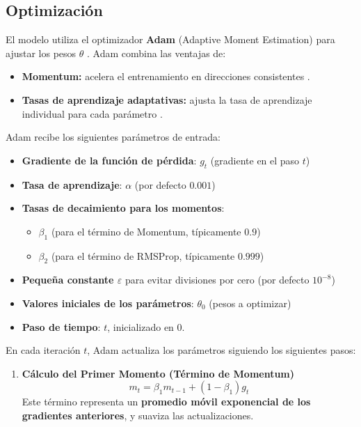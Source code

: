 \begin{itemize}
\subsection{Optimización}\label{o}

El modelo utiliza el optimizador \textbf{Adam} (Adaptive Moment Estimation) para ajustar los pesos \( \theta \) \cite{goodfellow2016deep}. Adam combina las ventajas de:
\begin{itemize}
    \item \textbf{Momentum:} acelera el entrenamiento en direcciones consistentes \cite{qian1999momentum}.
    \item \textbf{Tasas de aprendizaje adaptativas:} ajusta la tasa de aprendizaje individual para cada parámetro \cite{duchi2011adagrad}.
\end{itemize}

Adam recibe los siguientes parámetros de entrada:

\begin{itemize}
    \item \textbf{Gradiente de la función de pérdida}: \( g_t \) (gradiente en el paso \( t \))
    \item \textbf{Tasa de aprendizaje}: \( \alpha \) (por defecto \( 0.001 \))
    \item \textbf{Tasas de decaimiento para los momentos}:
    \begin{itemize}
        \item \( \beta_1 \) (para el término de Momentum, típicamente \( 0.9 \))
        \item \( \beta_2 \) (para el término de RMSProp, típicamente \( 0.999 \))
    \end{itemize}
    \item \textbf{Pequeña constante \( \varepsilon \)} para evitar divisiones por cero (por defecto \( 10^{-8} \))
    \item \textbf{Valores iniciales de los parámetros}: \( \theta_0 \) (pesos a optimizar)
    \item \textbf{Paso de tiempo}: \( t \), inicializado en 0.
\end{itemize}

En cada iteración \( t \), Adam actualiza los parámetros siguiendo los siguientes pasos:

\begin{enumerate}
    \item \textbf{Cálculo del Primer Momento (Término de Momentum)}
    \begin{equation}
        m_t = \beta_1 m_{t-1} + (1 - \beta_1) g_t
    \end{equation}
    Este término representa un \textbf{promedio móvil exponencial de los gradientes anteriores}, y suaviza las actualizaciones.


\end{enumerate}
\end{itemize}
